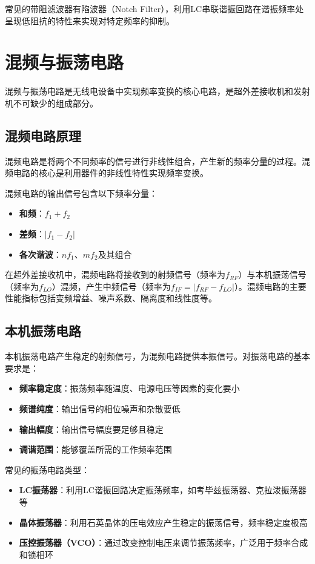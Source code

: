 \documentclass[12pt,UTF8]{ctexbook}
\begin{document}
常见的带阻滤波器有陷波器（Notch Filter），利用LC串联谐振回路在谐振频率处呈现低阻抗的特性来实现对特定频率的抑制。

\section{混频与振荡电路}

混频与振荡电路是无线电设备中实现频率变换的核心电路，是超外差接收机和发射机不可缺少的组成部分。

\subsection{混频电路原理}

混频电路是将两个不同频率的信号进行非线性组合，产生新的频率分量的过程。混频电路的核心是利用器件的非线性特性实现频率变换。

混频电路的输出信号包含以下频率分量：
\begin{itemize}[leftmargin=3.5em]
    \item \textbf{和频}：$f_1 + f_2$
    \item \textbf{差频}：$|f_1 - f_2|$
    \item \textbf{各次谐波}：$nf_1$、$mf_2$及其组合
\end{itemize}

在超外差接收机中，混频电路将接收到的射频信号（频率为$f_{RF}$）与本机振荡信号（频率为$f_{LO}$）混频，产生中频信号（频率为$f_{IF} = |f_{RF} - f_{LO}|$）。混频电路的主要性能指标包括变频增益、噪声系数、隔离度和线性度等。

\subsection{本机振荡电路}

本机振荡电路产生稳定的射频信号，为混频电路提供本振信号。对振荡电路的基本要求是：

\begin{itemize}[leftmargin=3.5em]
    \item \textbf{频率稳定度}：振荡频率随温度、电源电压等因素的变化要小
    \item \textbf{频谱纯度}：输出信号的相位噪声和杂散要低
    \item \textbf{输出幅度}：输出信号幅度要足够且稳定
    \item \textbf{调谐范围}：能够覆盖所需的工作频率范围
\end{itemize}

常见的振荡电路类型：
\begin{itemize}[leftmargin=3.5em]
    \item \textbf{LC振荡器}：利用LC谐振回路决定振荡频率，如考毕兹振荡器、克拉泼振荡器等
    \item \textbf{晶体振荡器}：利用石英晶体的压电效应产生稳定的振荡信号，频率稳定度极高
    \item \textbf{压控振荡器（VCO）}：通过改变控制电压来调节振荡频率，广泛用于频率合成和锁相环
\end{itemize}
\end{document}
